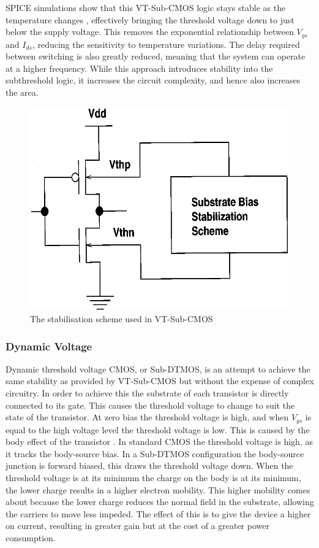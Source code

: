 SPICE simulations show that this VT-Sub-CMOS logic stays stable as the temperature changes \cite{IEEEVLSIRobustSTL}, effectively bringing the threshold voltage down to just below the supply voltage.
This removes the exponential relationship between $V_{gs}$ and $I_{ds}$, reducing the sensitivity to temperature variations.
The delay required between switching is also greatly reduced, meaning that the system can operate at a higher frequency.
While this approach introduces stability into the subthreshold logic, it increases the circuit complexity, and hence also increases the area.

\begin{figure}
	\centering
	\includegraphics[width=\columnwidth]{../../images/vtsubcmos.png}
	\caption{The stabilisation scheme used in VT-Sub-CMOS \cite{IEEEVLSIRobustSTL}}
	\label{fig:vtsubcmos}
\end{figure}

\subsubsection{Dynamic Voltage}
Dynamic threshold voltage CMOS, or Sub-DTMOS, is an attempt to achieve the same stability as provided by VT-Sub-CMOS but without the expense of complex circuitry.
In order to achieve this the substrate of each transistor is directly connected to its gate.
This causes the threshold voltage to change to suit the state of the transistor.
At zero bias the threshold voltage is high, and when $V_{gs}$ is equal to the high voltage level the threshold voltage is low.
This is caused by the body effect of the transistor \cite{DTMOSToE}.
In standard CMOS the threshold voltage is high, as it tracks the body-source bias.
In a Sub-DTMOS configuration the body-source junction is forward biased, this draws the threshold voltage down.
When the threshold voltage is at its minimum the charge on the body is at its minimum, the lower charge results in a higher electron mobility.
This higher mobility comes about because the lower charge reduces the normal field in the substrate, allowing the carriers to move less impeded.
The effect of this is to give the device a higher on current, resulting in greater gain but at the cost of a greater power consumption.

